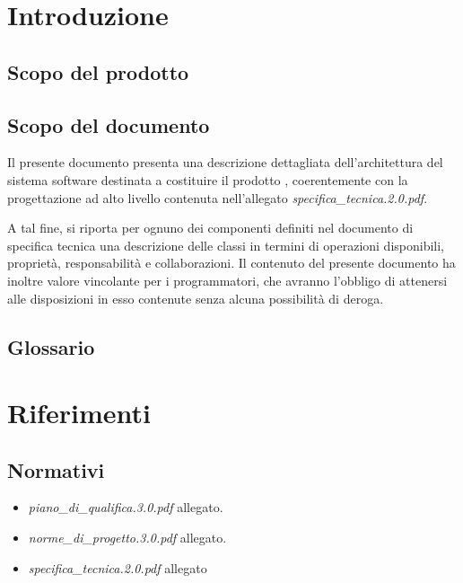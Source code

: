 

\setcounter{page}{1}
\pagestyle{normal}

\newpage

\section{Introduzione}
\subsection{Scopo del prodotto}
\purpose

\subsection{Scopo del documento}
Il presente documento presenta una descrizione dettagliata dell'architettura del sistema software destinata a costituire il prodotto \caName{}, coerentemente con la progettazione ad alto livello contenuta nell'allegato \textit{specifica\_tecnica.2.0.pdf}.

A tal fine, si riporta per ognuno dei componenti definiti nel documento di specifica tecnica una descrizione delle classi in termini di operazioni disponibili, proprietà, responsabilità e collaborazioni. Il contenuto del presente documento ha inoltre valore vincolante per i programmatori, che avranno l'obbligo di attenersi alle disposizioni in esso contenute senza alcuna possibilità di deroga.

\subsection{Glossario}
\glossaryIntro


\clearpage

\section{Riferimenti}
\subsection{Normativi}
\begin{itemize}
\item[] \textit{piano\_di\_qualifica.3.0.pdf} allegato.
\item[] \textit{norme\_di\_progetto.3.0.pdf} allegato.
\item[] \textit{specifica\_tecnica.2.0.pdf} allegato
\end{itemize}

